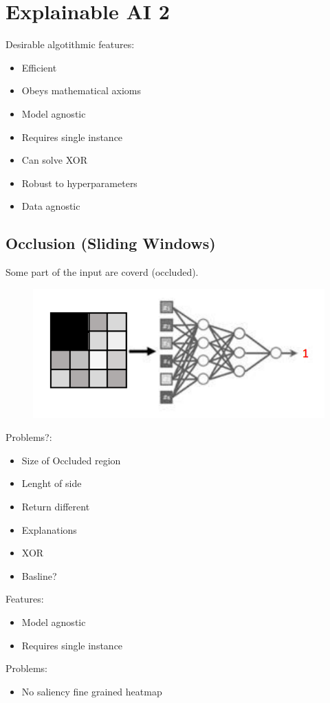 \section{Explainable AI 2}
Desirable algotithmic features:
\begin{itemize}
    \item Efficient
    \item Obeys mathematical axioms
    \item Model agnostic
    \item Requires single instance
    \item Can solve XOR
    \item Robust to hyperparameters
    \item Data agnostic
\end{itemize}
\subsection{Occlusion (Sliding Windows)}
Some part of the input are coverd (occluded).
\begin{figure}[!h]
    \centering
    \includegraphics[width = 0.5\columnwidth]{figures/XAI2/Occlusion.png}
\end{figure}

Problems?:
\begin{itemize}
    \item Size of Occluded region
    \item Lenght of side
    \item Return different
    \item Explanations
    \item XOR
    \item Basline?
\end{itemize}
Features:
\begin{itemize}
    \item Model agnostic
    \item Requires single instance
\end{itemize}
Problems:
\begin{itemize}
    \item No saliency fine grained heatmap
\end{itemize}

